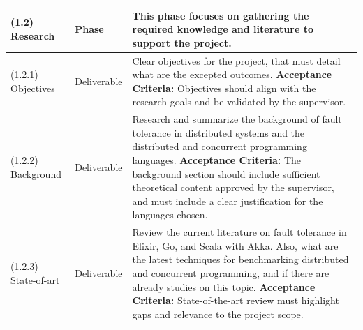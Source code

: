 \begin{longtable}{|p{3cm}|p{2.5cm}|p{8cm}|}
    (1.2) Research                 & Phase                 & This phase focuses on gathering the required knowledge and literature to support the project.                                                                                                                                                                                                                                                             \\ \hline
    (1.2.1) Objectives             & Deliverable           & Clear objectives for the project, that must detail what are the excepted outcomes. \newline \textbf{Acceptance Criteria:} Objectives should align with the research goals and be validated by the supervisor.                                                                                                                                             \\ \hline
    (1.2.2) Background             & Deliverable           & Research and summarize the background of fault tolerance in distributed systems and the distributed and concurrent programming languages.  \newline \textbf{Acceptance Criteria:} The background section should include sufficient theoretical content approved by the supervisor, and must include a clear justification for the languages chosen.       \\ \hline
    (1.2.3) State-of-art           & Deliverable           & Review the current literature on fault tolerance in Elixir, Go, and Scala with Akka. Also, what are the latest techniques for benchmarking distributed and concurrent programming, and if there are already studies on this topic. \newline \textbf{Acceptance Criteria:} State-of-the-art review must highlight gaps and relevance to the project scope. \\ \hline
    \hline %


\end{longtable}
